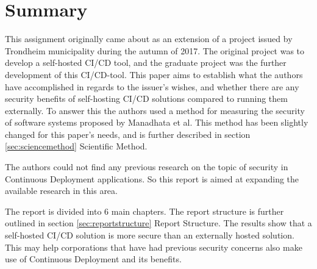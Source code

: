 \chapter*{Summary} %
\label{chap:summary}
This assignment originally came about as an extension of a project issued by Trondheim municipality during the autumn of 2017. The original project was to develop a self-hosted \acrfull{CI/CD} tool, and the graduate project was the further development of this \acrshort{CI/CD}-tool. This paper aims to establish what the authors have accomplished in regards to the issuer's wishes, and whether there are any security benefits of self-hosting \acrshort{CI/CD} solutions compared to running them externally. To answer this the authors used a method for measuring the security of software systems proposed by Manadhata et al. This method has been slightly changed for this paper's needs, and is further described in section \ref{sec:sciencemethod} Scientific Method.

The authors could not find any previous research on the topic of security in Continuous Deployment applications. So this report is aimed at expanding the available research in this area. 

The report is divided into 6 main chapters. The report structure is further outlined in section \ref{sec:reportstructure} Report Structure.
The results show that a self-hosted \acrshort{CI/CD} solution is more secure than an externally hosted solution. This may help corporations that have had previous security concerns also make use of Continuous Deployment and its benefits.

